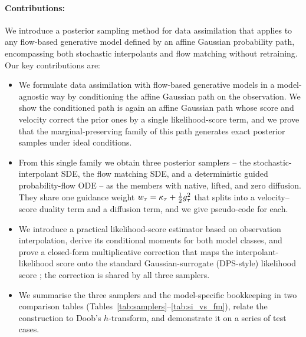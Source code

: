 \paragraph{Contributions:}
We introduce a posterior sampling method for data assimilation that applies to any flow-based generative model defined by an affine Gaussian probability path, encompassing both stochastic interpolants and flow matching without retraining. Our key contributions are:
\begin{itemize}
    \item We formulate data assimilation with flow-based generative models in a model-agnostic way by conditioning the affine Gaussian path on the observation. We show the conditioned path is again an affine Gaussian path whose score and velocity correct the prior ones by a single likelihood-score term, and we prove that the marginal-preserving family of this path generates exact posterior samples under ideal conditions.
    \item From this single family we obtain three posterior samplers -- the stochastic-interpolant SDE, the flow matching SDE, and a deterministic guided probability-flow ODE -- as the members with native, lifted, and zero diffusion. They share one guidance weight $w_\tau=\kappa_\tau+\tfrac12g_\tau^2$ that splits into a velocity--score duality term and a diffusion term, and we give pseudo-code for each.
    \item We introduce a practical likelihood-score estimator based on observation interpolation, derive its conditional moments for both model classes, and prove a closed-form multiplicative correction that maps the interpolant-likelihood score onto the standard Gaussian-surrogate (DPS-style) likelihood score \cite{chung_diffusion_2023, song_pseudoinverse_2023}; the correction is shared by all three samplers.
    \item We summarise the three samplers and the model-specific bookkeeping in two comparison tables (Tables~\ref{tab:samplers}--\ref{tab:si_vs_fm}), relate the construction to Doob's $h$-transform, and demonstrate it on a series of test cases.
\end{itemize}
